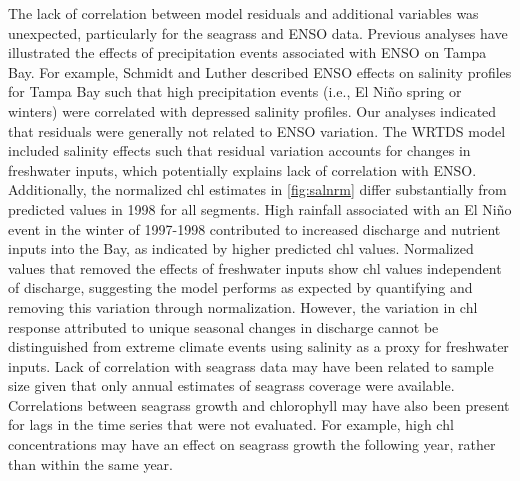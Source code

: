 \documentclass{svjour3}\usepackage[]{graphicx}\usepackage[]{color}
\begin{document}
The lack of correlation between model residuals and additional variables was unexpected, particularly for the seagrass and \ac{ENSO} data.  Previous analyses have illustrated the effects of precipitation events associated with \ac{ENSO} on Tampa Bay.  For example, Schmidt and Luther \cite{Schmidt02} described \ac{ENSO} effects on salinity profiles for Tampa Bay such that high precipitation events (i.e., El Ni\~{n}o spring or winters) were correlated with depressed salinity profiles.  Our analyses indicated that residuals were generally not related to \ac{ENSO} variation.  The \ac{WRTDS} model included salinity effects such that residual variation accounts for changes in freshwater inputs, which potentially explains lack of correlation with \ac{ENSO}. Additionally, the normalized \ac{chl} estimates in \cref{fig:salnrm} differ substantially from predicted values in 1998 for all segments.  High rainfall associated with an El Ni\~{n}o event in the winter of 1997-1998 contributed to increased discharge and nutrient inputs into the Bay, as indicated by higher predicted \ac{chl} values.  Normalized values that removed the effects of freshwater inputs show \ac{chl} values independent of discharge, suggesting the model performs as expected by quantifying and removing this variation through normalization.  However, the variation in \ac{chl} response attributed to unique seasonal changes in discharge cannot be distinguished from extreme climate events using salinity as a proxy for freshwater inputs.  Lack of correlation with seagrass data may have been related to sample size given that only annual estimates of seagrass coverage were available.  Correlations between seagrass growth and chlorophyll may have also been present for lags in the time series that were not evaluated.  For example, high \ac{chl} concentrations may have an effect on seagrass growth the following year, rather than within the same year.
\end{document}

